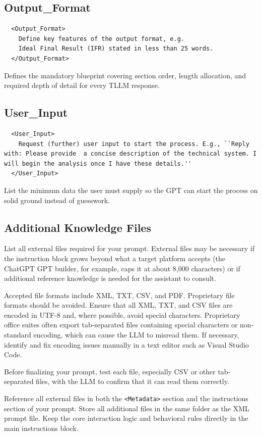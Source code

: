 \documentclass[a4paper,11pt]{refart}
\begin{document}
\subsection {Output\_Format}
\begin{lstlisting}
  <Output_Format>
    Define key features of the output format, e.g.
    Ideal Final Result (IFR) stated in less than 25 words.
  </Output_Format>
\end{lstlisting}
Defines the mandatory blueprint covering section order, length allocation, and required depth of detail for every TLLM response.

\subsection {User\_Input}
\begin{lstlisting}
  <User_Input>
    Request (further) user input to start the process. E.g., ``Reply with: Please provide  a concise description of the technical system. I will begin the analysis once I have these details.''
  </User_Input>
\end{lstlisting}
List the minimum data the user must supply so the GPT can start the process on solid ground instead of guesswork.

\subsection{Additional Knowledge Files}\label{sec:additional-knowledge-files}
List all external files required for your prompt. External files may be necessary if the instruction block grows beyond what a target platform accepts (the ChatGPT GPT builder, for example, caps it at about 8,000 characters) or if additional reference knowledge is needed for the assistant to consult.

Accepted file formats include XML, TXT, CSV, and PDF. Proprietary file formats should be avoided. Ensure that all XML, TXT, and CSV files are encoded in UTF-8 and, where possible, avoid special characters. Proprietary office suites often export tab-separated files containing special characters or non-standard encoding, which can cause the LLM to misread them. If necessary, identify and fix encoding issues manually in a text editor such as Visual Studio Code.

Before finalizing your prompt, test each file, especially CSV or other tab-separated files, with the LLM to confirm that it can read them correctly.

Reference all external files in both the \lstinline!<Metadata>! section and the instructions section of your prompt. Store all additional files in the same folder as the XML prompt file. Keep the core interaction logic and behavioral rules directly in the main instructions block.
\end{document}
